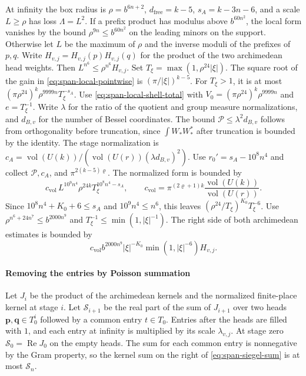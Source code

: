 At infinity the box radius is \(\rho=b^{6n+2}\),
\(d_{\mathrm{free}}=k-5\), \(s_A=k-3n-6\), and a scale \(L\ge\rho\)
has loss \(\Lambda=L^2\). If a prefix product has modulus above
\(b^{60n^2}\), the local form vanishes by the bound
\(\rho^{9n}\le b^{60n^2}\) on the leading minors on the support.
Otherwise let \(L\) be the maximum of \(\rho\) and the inverse moduli
of the prefixes of \(p,q\). Write \(H_{v,j}=H_{v,j}(p)H_{v,j}(q)\)
for the product of the two archimedean head weights. Then
\(L^{n^6}\le\rho^{n^6}H_{v,j}\).
Set \(T_\xi=\max(1,\rho^{24}|\xi|)\).
The square root of the gain in \eqref{eq:span-local-pointwise} is
\((\pi/|\xi|)^{k-5}\). For \(T_\xi>1\), it is at most
\((\pi\rho^{24})^k\rho^{9999n}T_\xi^{-s_A}\).
Use \eqref{eq:span-local-shell-total} with
\(V_0=(\pi\rho^{24})^k\rho^{9999n}\) and \(e=T_\xi^{-1}\).
Write \(\lambda\) for the ratio of the quotient and group measure
normalizations, and \(d_{B,v}\) for the number of Bessel coordinates.
The bound \(\mathcal P\le\lambda^2d_{B,v}\) follows from orthogonality
before truncation, since \(\int W_\ast W_\ast^*\) after truncation
is bounded by the identity. The stage normalization is
\(c_A=\operatorname{vol}(U(k))/(\operatorname{vol}(U(r))(\lambda d_{B,v})^2)\).
Use \(r_0'=s_A-10^8n^4\) and collect \(\mathcal P,c_A\), and
\(\pi^{2(k-5)\varrho}\). The normalized form is bounded by
\[
 c_{\mathrm{vol}}\,L^{10^9n^4}\rho^{24k}
            T_\xi^{10^8n^4-s_A},\qquad
 c_{\mathrm{vol}}=\pi^{(2\varrho+1)k}
                     \frac{\operatorname{vol}(U(k))}{\operatorname{vol}(U(r))}.
\]
Since \(10^8n^4+K_0+6\le s_A\) and \(10^9n^4\le n^6\), this leaves
\((\rho^{24}/T_\xi)^{K_0}T_\xi^{-6}\).
Use \(\rho^{n^6+24n^7}\le b^{2000n^9}\) and
\(T_\xi^{-1}\le\min(1,|\xi|^{-1})\). The right side of both
archimedean estimates is bounded by
\begin{equation}\label{eq:span-arch-decay}
 c_{\mathrm{vol}}b^{2000n^9}|\xi|^{-K_0}
                       \min(1,|\xi|^{-6})H_{v,j}.
\end{equation}

\paragraph{Removing the entries by Poisson summation}
Let \(J_i\) be the product of the archimedean kernels and the normalized
finite-place kernel at stage \(i\). Let \(\mathcal S_{i+1}\) be the real part of
the sum of \(J_{i+1}\) over two heads \(\mathbf p,\mathbf q\in T_0^i\)
followed by a common entry \(t\in T_0\). Entries after the heads are filled
with \(1\), and each entry at infinity is multiplied by its scale
\(\lambda_{v,j}\). At stage zero \(\mathcal S_0=\operatorname{Re}J_0\) on the empty
heads. The sum for each common entry is nonnegative by the Gram property,
so the kernel sum on the right of \eqref{eq:span-siegel-sum} is at most \(\mathcal S_n\).

